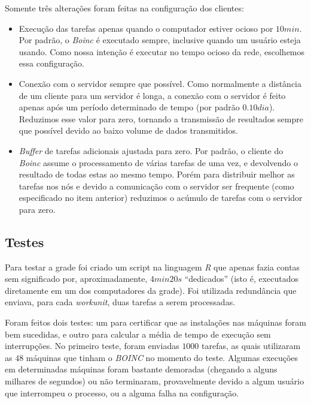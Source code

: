Somente três alterações foram feitas na configuração dos clientes: 


\begin{itemize}
   \item Execução das tarefas apenas quando o computador estiver ocioso por $10min$. Por padrão, o \textit{Boinc} é 
executado sempre, inclusive quando um usuário esteja usando. Como nossa intenção é executar no tempo ocioso da rede, 
escolhemos essa configuração. 
   \item Conexão com o servidor sempre que possível. Como normalmente a distância de um cliente para um servidor é longa,
a conexão com o servidor é feito apenas após um período determinado de tempo (por padrão $0.10 dia$). Reduzimos 
esse valor para zero, tornando a transmissão de resultados sempre que possível devido ao baixo volume de dados transmitidos. 
   \item \emph{Buffer} de tarefas adicionais ajustada para zero. Por padrão, o cliente do \textit{Boinc} assume o processamento de várias
tarefas de uma vez, e devolvendo o resultado de todas estas ao mesmo tempo. Porém para distribuir melhor as
tarefas nos nós e devido a comunicação com o servidor ser frequente (como especificado no item anterior)
reduzimos o acúmulo de tarefas com o servidor para zero.
\end{itemize} 


\subsection{Testes}



Para testar a grade foi criado um script na linguagem \emph{R} que apenas fazia contas sem significado 
por, aproximadamente, $4min20s$ ``dedicados'' (isto é, executados diretamente em um dos computadores da grade). Foi utilizada  
redundância que enviava, 
para cada \textit{workunit}, duas tarefas a serem processadas.

Foram feitos dois testes: um para certificar que as instalações nas máquinas foram bem sucedidas, e outro para calcular a média de tempo de execução sem interrupções. No primeiro teste, foram enviadas $1000$ tarefas, as quais utilizaram as $48$ máquinas que tinham o \textit{BOINC} no momento do teste. Algumas execuções em determinadas máquinas foram bastante demoradas (chegando a alguns milhares de segundos) ou não terminaram, provavelmente devido a algum usuário que interrompeu o processo, ou a alguma falha na configuração. 

